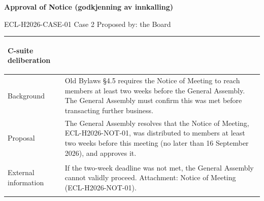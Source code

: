 \documentclass{../../../Common/Latex/Templates/rapport}
\begin{document}
\reportmainmatter
\small
\setlength{\parindent}{0pt}
\setlength{\tabcolsep}{6pt}
\renewcommand{\arraystretch}{1.2}

\begin{center}
  {\Large\bfseries Approval of Notice (godkjenning av innkalling)}\par
  \vspace{0.15cm}
  {\normalsize ECL-H2026-CASE-01 \textperiodcentered{} Case 2 \textperiodcentered{} Proposed by: the Board}\par
  \vspace{0.1cm}
  {\small \meetingline}\par
\end{center}

\vspace{0.3cm}
\begin{tabularx}{\textwidth}{|>{\bfseries\raggedright\arraybackslash}p{4.2cm}|X|}
  \hline
  C-suite deliberation & \rule{0pt}{4.1cm} \\
  \hline
  Background           & Old Bylaws \S4.5 requires the Notice of Meeting to reach members at least two weeks before the General Assembly. The General Assembly must confirm this was met before transacting further business. \\
  \hline
  Proposal             & The General Assembly resolves that the Notice of Meeting, ECL-H2026-NOT-01, was distributed to members at least two weeks before this meeting (no later than 16 September 2026), and approves it. \\
  \hline
  External information & If the two-week deadline was not met, the General Assembly cannot validly proceed. Attachment: Notice of Meeting (ECL-H2026-NOT-01). \\
  \hline
\end{tabularx}
\end{document}
